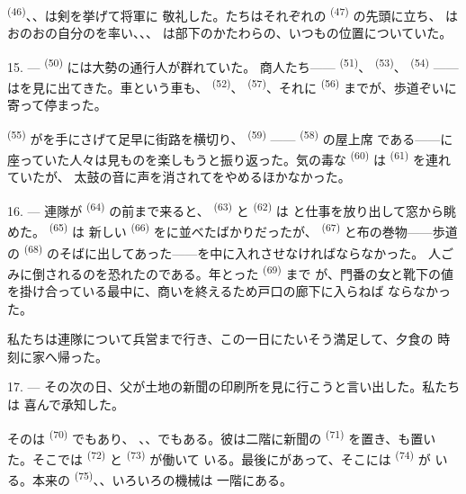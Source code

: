  \textsuperscript{(46)}、、は剣を挙げて将軍に
敬礼した。たちはそれぞれの \textsuperscript{(47)} の先頭に立ち、
はおのおの自分のを率い、、、
は部下のかたわらの、いつもの位置についていた。

15. ---  \textsuperscript{(50)} には大勢の通行人が群れていた。
商人たち—— \textsuperscript{(51)}、 \textsuperscript{(53)}、
 \textsuperscript{(54)} ——はを見に出てきた。車という車も、
 \textsuperscript{(52)}、 \textsuperscript{(57)}、それに
 \textsuperscript{(56)} までが、歩道ぞいに寄って停まった。

\VUsaut{3.0mm}

 \textsuperscript{(55)} がを手にさげて足早に街路を横切り、
 \textsuperscript{(59)} —— \textsuperscript{(58)} の屋上席
である——に座っていた人々は見ものを楽しもうと振り返った。気の毒な
\textsuperscript{(60)} は \textsuperscript{(61)} を連れていたが、
太鼓の音に声を消されてをやめるほかなかった。

16. --- 連隊が \textsuperscript{(64)} の前まで来ると、
 \textsuperscript{(63)} と \textsuperscript{(62)} は
と仕事を放り出して窓から眺めた。 \textsuperscript{(65)} は
新しい \textsuperscript{(66)} をに並べたばかりだったが、
 \textsuperscript{(67)} と布の巻物——歩道の
\textsuperscript{(68)} のそばに出してあった——を中に入れさせなければならなかった。
人ごみに倒されるのを恐れたのである。年とった \textsuperscript{(69)} まで
が、門番の女と靴下の値を掛け合っている最中に、商いを終えるため戸口の廊下に入らねば
ならなかった。

私たちは連隊について兵営まで行き、この一日にたいそう満足して、夕食の
時刻に家へ帰った。

\VUsaut{3.0mm}

17. --- その次の日、父が土地の新聞の印刷所を見に行こうと言い出した。私たちは
喜んで承知した。

そのは \textsuperscript{(70)} でもあり、
、、でもある。彼は二階に新聞の
 \textsuperscript{(71)} を置き、も置いた。そこでは
 \textsuperscript{(72)} と \textsuperscript{(73)} が働いて
いる。最後にがあって、そこには \textsuperscript{(74)} が
いる。本来の \textsuperscript{(75)}、、いろいろの機械は
一階にある。

